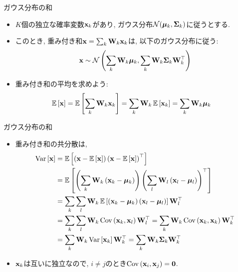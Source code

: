 \documentclass[dvipdfmx,notheorems,t]{beamer}
\begin{document}
\begin{frame}{ガウス分布の和}
\begin{itemize}
  \item $K$個の独立な確率変数$\vb{x}_k$があり, ガウス分布$\mathcal{N}(\vb*{\mu}_k, \vb{\Sigma}_k)$に従うとする.
  \item このとき, 重み付き和$\vb{x} = \sum_k \vb{W}_k \vb{x}_k$は, 以下のガウス分布に従う:
  \begin{align*}
    \vb{x} \sim \mathcal{N} \left( \sum_k \vb{W}_k \vb*{\mu}_k, \sum_k \vb{W}_k \vb{\Sigma}_k \vb{W}_k^\top \right)
  \end{align*}
  \item 重み付き和の平均を求めよう:
  \begin{align*}
    \operatorname{\mathbb{E}} \left[ \vb{x} \right] &= \operatorname{\mathbb{E}} \left[ \sum_k \vb{W}_k \vb{x}_k \right] = \sum_k \vb{W}_k \operatorname{\mathbb{E}} \left[ \vb{x}_k \right]
      = \sum_k \vb{W}_k \vb*{\mu}_k
  \end{align*}
\end{itemize}
\end{frame}

\begin{frame}{ガウス分布の和}
\begin{itemize}
  \item 重み付き和の共分散は,
  \begin{align*}
    \operatorname{Var} \left[ \vb{x} \right] &= \operatorname{\mathbb{E}} \left[ \left( \vb{x} - \operatorname{\mathbb{E}} \left[ \vb{x} \right] \right) \left( \vb{x} - \operatorname{\mathbb{E}} \left[ \vb{x} \right] \right)^\top \right] \\
      &= \operatorname{\mathbb{E}} \left[ \left( \sum_k \vb{W}_k \left( \vb{x}_k - \vb*{\mu}_k \right) \right)
        \left( \sum_l \vb{W}_l \left( \vb{x}_l - \vb*{\mu}_l \right) \right)^\top \right] \\
      &= \sum_k \sum_l \vb{W}_k \operatorname{\mathbb{E}} \left[ \left( \vb{x}_k - \vb*{\mu}_k \right)
        \left( \vb{x}_l - \vb*{\mu}_l \right) \right] \vb{W}_l^\top \\
      &= \sum_k \sum_l \vb{W}_k \operatorname{Cov} \left( \vb{x}_k, \vb{x}_l \right) \vb{W}_l^\top
      = \sum_k \vb{W}_k \operatorname{Cov} \left( \vb{x}_k, \vb{x}_k \right) \vb{W}_k^\top \\
      &= \sum_k \vb{W}_k \operatorname{Var} \left[ \vb{x}_k \right] \vb{W}_k^\top
      = \sum_k \vb{W}_k \vb{\Sigma}_k \vb{W}_k^\top
  \end{align*}
  \item $\vb{x}_k$は互いに独立なので, $i \neq j$のとき$\operatorname{Cov} \left( \vb{x}_i, \vb{x}_j \right) = \vb{0}$.
\end{itemize}
\end{frame}
\end{document}
